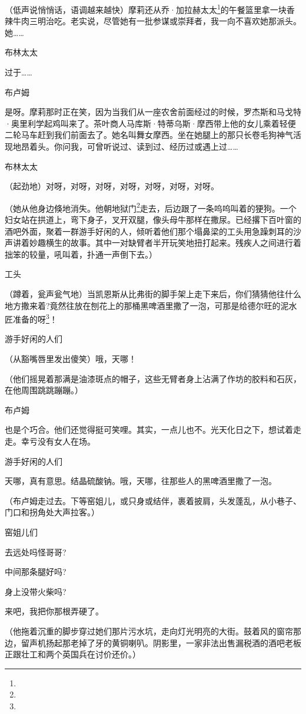 \par （低声说悄悄话，语调越来越快）摩莉还从乔·加拉赫太太\footnote{}的午餐篮里拿一块香辣牛肉三明治吃。老实说，尽管她有一批参谋或崇拜者，我一向不喜欢她那派头。她……
\par 布林太太
\par 过于……
\par 布卢姆
\par 是呀。摩莉那时正在笑，因为当我们从一座农舍前面经过的时候，罗杰斯和马戈特·奥里利学起鸡叫来了。茶叶商人马库斯·特蒂乌斯·摩西带上他的女儿乘着轻便二轮马车赶到我们前面去了。她名叫舞女摩西。坐在她腿上的那只长卷毛狗神气活现地昂着头。你问我，可曾听说过、读到过、经历过或遇上过……
\par 布林太太
\par （起劲地）对呀，对呀，对呀，对呀，对呀，对呀，对呀。
\par （她从他身边倏地消失。他朝地狱门\footnote{}走去，后边跟了一条呜呜叫着的㹴狗。一个妇女站在拱道上，弯下身子，叉开双腿，像头母牛那样在撒尿。已经撂下百叶窗的酒吧外面，聚着一群游手好闲的人，倾听着他们那个塌鼻梁的工头用急躁刺耳的沙声讲着妙趣横生的故事。其中一对缺臂者半开玩笑地扭打起来。残疾人之间进行着拙笨的较量，吼叫着，扑通一声倒下去。）
\par 工头
\par （蹲着，瓮声瓮气地）当凯恩斯从比弗街的脚手架上走下来后，你们猜猜他往什么地方撒来着?竟然往放在刨花上的那桶黑啤酒里撒了一泡，可那是给德尔旺的泥水匠准备的呀\footnote{}！
\par 游手好闲的人们
\par （从豁嘴唇里发出傻笑）哦，天哪！
\par （他们摇晃着那满是油漆斑点的帽子，这些无臂者身上沾满了作坊的胶料和石灰，在他周围跳跳蹦蹦。）
\par 布卢姆
\par 也是个巧合。他们还觉得挺可笑哩。其实，一点儿也不。光天化日之下，想试着走走。幸亏没有女人在场。
\par 游手好闲的人们
\par 天哪，真有意思。结晶硫酸钠。哦，天哪，往那些人的黑啤酒里撒了一泡。
\par （布卢姆走过去。下等窑姐儿，或只身或结伴，裹着披肩，头发蓬乱，从小巷子、门口和拐角处大声拉客。）
\par 窑姐儿们
\par 去远处吗怪哥哥?
\par 中间那条腿好吗?
\par 身上没带火柴吗?
\par 来吧，我把你那根弄硬了。
\par （他拖着沉重的脚步穿过她们那片污水坑，走向灯光明亮的大街。鼓着风的窗帘那边，留声机扬起那老掉了牙的黄铜喇叭。阴影里，一家非法出售漏税酒的酒吧老板正跟壮工和两个英国兵在讨价还价。）
